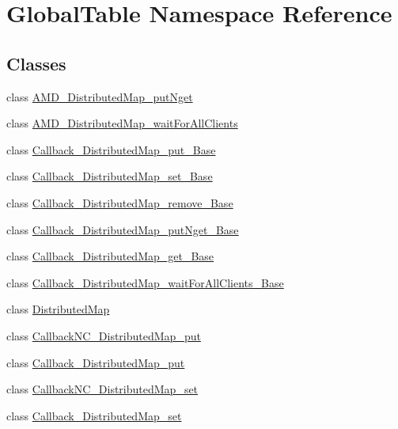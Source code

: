 \hypertarget{namespace_global_table}{
\section{GlobalTable Namespace Reference}
\label{namespace_global_table}
}
\subsection*{Classes}
\begin{DoxyCompactItemize}
\item 
class \hyperlink{class_global_table_1_1_a_m_d___distributed_map__put_nget}{AMD\_\-DistributedMap\_\-putNget}
\item 
class \hyperlink{class_global_table_1_1_a_m_d___distributed_map__wait_for_all_clients}{AMD\_\-DistributedMap\_\-waitForAllClients}
\item 
class \hyperlink{class_global_table_1_1_callback___distributed_map__put___base}{Callback\_\-DistributedMap\_\-put\_\-Base}
\item 
class \hyperlink{class_global_table_1_1_callback___distributed_map__set___base}{Callback\_\-DistributedMap\_\-set\_\-Base}
\item 
class \hyperlink{class_global_table_1_1_callback___distributed_map__remove___base}{Callback\_\-DistributedMap\_\-remove\_\-Base}
\item 
class \hyperlink{class_global_table_1_1_callback___distributed_map__put_nget___base}{Callback\_\-DistributedMap\_\-putNget\_\-Base}
\item 
class \hyperlink{class_global_table_1_1_callback___distributed_map__get___base}{Callback\_\-DistributedMap\_\-get\_\-Base}
\item 
class \hyperlink{class_global_table_1_1_callback___distributed_map__wait_for_all_clients___base}{Callback\_\-DistributedMap\_\-waitForAllClients\_\-Base}
\item 
class \hyperlink{class_global_table_1_1_distributed_map}{DistributedMap}
\item 
class \hyperlink{class_global_table_1_1_callback_n_c___distributed_map__put}{CallbackNC\_\-DistributedMap\_\-put}
\item 
class \hyperlink{class_global_table_1_1_callback___distributed_map__put}{Callback\_\-DistributedMap\_\-put}
\item 
class \hyperlink{class_global_table_1_1_callback_n_c___distributed_map__set}{CallbackNC\_\-DistributedMap\_\-set}
\item 
class \hyperlink{class_global_table_1_1_callback___distributed_map__set}{Callback\_\-DistributedMap\_\-set}

\end{DoxyCompactItemize}
